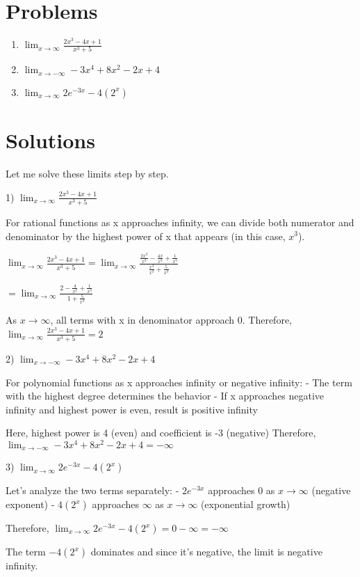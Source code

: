 \documentclass{article}
\begin{document}
\section*{Problems}
\begin{enumerate}
\item $\displaystyle \lim_{x \to \infty} \frac{2x^3-4x+1}{x^3+5}$
\item $\displaystyle \lim_{x \to -\infty} -3x^4 + 8x^2 - 2x + 4$
\item $\displaystyle \lim_{x \to \infty} 2e^{-3x} - 4(2^x)$
\end{enumerate}


\section*{Solutions}
Let me solve these limits step by step.

1) $\displaystyle \lim_{x \to \infty} \frac{2x^3-4x+1}{x^3+5}$

For rational functions as x approaches infinity, we can divide both numerator and denominator by the highest power of x that appears (in this case, $x^3$).

$\displaystyle \lim_{x \to \infty} \frac{2x^3-4x+1}{x^3+5} = \lim_{x \to \infty} \frac{\frac{2x^3}{x^3}-\frac{4x}{x^3}+\frac{1}{x^3}}{\frac{x^3}{x^3}+\frac{5}{x^3}}$

$\displaystyle = \lim_{x \to \infty} \frac{2-\frac{4}{x^2}+\frac{1}{x^3}}{1+\frac{5}{x^3}}$

As $x \to \infty$, all terms with x in denominator approach 0.
Therefore, $\displaystyle \lim_{x \to \infty} \frac{2x^3-4x+1}{x^3+5} = 2$

2) $\displaystyle \lim_{x \to -\infty} -3x^4 + 8x^2 - 2x + 4$

For polynomial functions as x approaches infinity or negative infinity:
- The term with the highest degree determines the behavior
- If x approaches negative infinity and highest power is even, result is positive infinity

Here, highest power is 4 (even) and coefficient is -3 (negative)
Therefore, $\displaystyle \lim_{x \to -\infty} -3x^4 + 8x^2 - 2x + 4 = -\infty$

3) $\displaystyle \lim_{x \to \infty} 2e^{-3x} - 4(2^x)$

Let's analyze the two terms separately:
- $2e^{-3x}$ approaches 0 as $x \to \infty$ (negative exponent)
- $4(2^x)$ approaches $\infty$ as $x \to \infty$ (exponential growth)

Therefore, $\displaystyle \lim_{x \to \infty} 2e^{-3x} - 4(2^x) = 0 - \infty = -\infty$

The term $-4(2^x)$ dominates and since it's negative, the limit is negative infinity.
\end{document}
